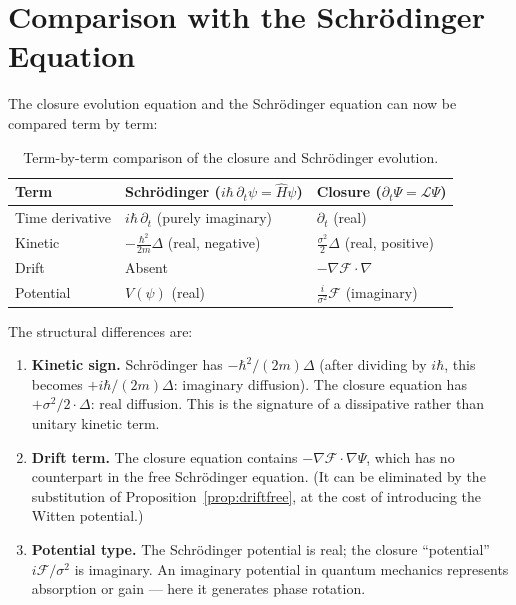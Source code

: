 \documentclass[12pt]{article}
\newcommand{\Fcal}{\mathcal{F}}
\newcommand{\Lcal}{\mathcal{L}}
\begin{document}
\section{Comparison with the Schr\"odinger Equation}\label{sec:schrodinger}

The closure evolution equation and the Schr\"odinger equation can now be compared term by term:

\begin{table}[ht]
\centering
\caption{Term-by-term comparison of the closure and Schr\"odinger evolution.}
\label{tab:comparison}
\begin{tabular}{@{}lll@{}}
\toprule
Term & Schr\"odinger ($i\hbar\,\partial_t\psi = \hat{H}\psi$) & Closure ($\partial_t\Psi = \Lcal\Psi$) \\
\midrule
Time derivative & $i\hbar\,\partial_t$ (purely imaginary) & $\partial_t$ (real) \\
Kinetic & $-\frac{\hbar^2}{2m}\Delta$ (real, negative) & $\frac{\sigma^2}{2}\Delta$ (real, positive) \\
Drift & Absent & $-\nabla\Fcal\cdot\nabla$ \\
Potential & $V(\psi)$ (real) & $\frac{i}{\sigma^2}\Fcal$ (imaginary) \\
\bottomrule
\end{tabular}
\end{table}

The structural differences are:
\begin{enumerate}
    \item \textbf{Kinetic sign.} Schr\"odinger has $-\hbar^2/(2m)\Delta$ (after dividing by $i\hbar$, this becomes $+i\hbar/(2m)\Delta$: imaginary diffusion). The closure equation has $+\sigma^2/2\cdot\Delta$: real diffusion. This is the signature of a dissipative rather than unitary kinetic term.

    \item \textbf{Drift term.} The closure equation contains $-\nabla\Fcal\cdot\nabla\Psi$, which has no counterpart in the free Schr\"odinger equation. (It can be eliminated by the substitution of Proposition~\ref{prop:driftfree}, at the cost of introducing the Witten potential.)

    \item \textbf{Potential type.} The Schr\"odinger potential is real; the closure ``potential'' $i\Fcal/\sigma^2$ is imaginary. An imaginary potential in quantum mechanics represents absorption or gain --- here it generates phase rotation.
\end{enumerate}
\end{document}
